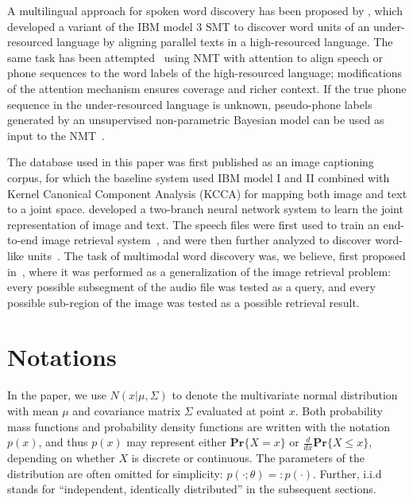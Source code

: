\documentclass[journal]{IEEEtran}
\begin{document}
A multilingual approach for spoken word discovery has been proposed by \cite{Stahlberg12}, which developed a variant of the IBM model 3 SMT to discover word units of an under-resourced language
by aligning parallel texts in
a high-resourced language.
The same task has been attempted~\cite{Duong16} using NMT with attention \cite{Bahdanau14} to align speech or phone sequences to the word labels of the high-resourced language; modifications of the attention mechanism ensures coverage and richer context.
If the true phone sequence in the under-resourced language is unknown,  pseudo-phone labels generated by an unsupervised non-parametric Bayesian model \cite{Ondel2018} can be used as input to the NMT~\cite{Godard2018}.
 
The database used in this paper was first published as an image captioning corpus, for which the baseline system
\cite{Hodosh2010} used IBM model I and II \cite{Brown93} combined with Kernel Canonical Component Analysis (KCCA) for mapping both image and text to a joint space. \cite{Karpathy14, Karpathy15} developed a two-branch neural network system to learn the joint representation of image and text.
The speech files were first used to train an end-to-end image retrieval system~\cite{Harwath15,Harwath16-ULO}, and were then further analyzed to discover word-like units~\cite{Harwath17}.
The task of multimodal word discovery was, we believe, first proposed in~\cite{Harwath17}, where it was performed as a generalization of the image retrieval problem: every possible subsegment of the audio file was tested as a query, and every possible sub-region of the image was tested as a possible retrieval result.

\section{Notations}
In the paper, 
we use $N(x|\mu, \Sigma)$ to denote the multivariate normal distribution with mean $\mu$ and covariance matrix $\Sigma$ evaluated at point $x$.
Both probability mass functions and probability density functions are written with the notation $p(x)$, and thus $p(x)$ may represent either $\mathbf{Pr}\{X=x\}$ or \(\frac{d}{dx} \mathbf{Pr}\{X \leq x\}\), depending on whether $X$ is discrete or continuous.
The parameters of the distribution are often omitted for simplicity: $p(\cdot;\theta) =: p(\cdot)$. Further, i.i.d stands for ``independent, identically distributed'' in the subsequent sections. 
\end{document}
